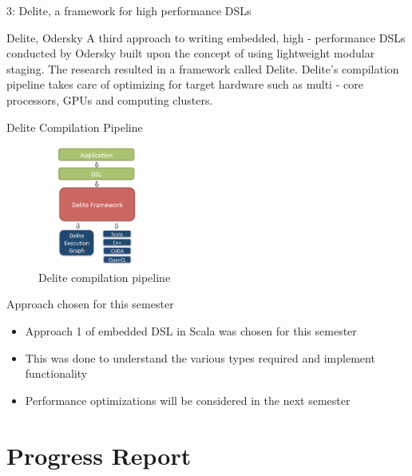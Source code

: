 \documentclass{beamer}
\begin{document}
\begin{frame}{3: Delite, a framework for high performance DSLs}
\begin{block}{Delite, Odersky}
A third approach to writing embedded, high - performance DSLs conducted by Odersky built upon the concept of using lightweight modular staging. The research resulted in a framework called Delite. Delite's compilation pipeline takes care of optimizing for target hardware such as multi - core processors, GPUs and computing clusters.
\end{block}
\end{frame}
 
\begin{frame}{Delite Compilation Pipeline}
\begin{figure}[h!]
  \centering
    \includegraphics[height=150px]{figures/delite.png}
  \caption{Delite compilation pipeline}
\end{figure}
\end{frame}

\begin{frame}{Approach chosen for this semester}
\begin{itemize}
\item Approach 1 of embedded DSL in Scala was chosen for this semester
\item This was done to understand the various types required and implement functionality
\item Performance optimizations will be considered in the next semester
\end{itemize}
\end{frame}


\section{Progress Report}
\end{document}
